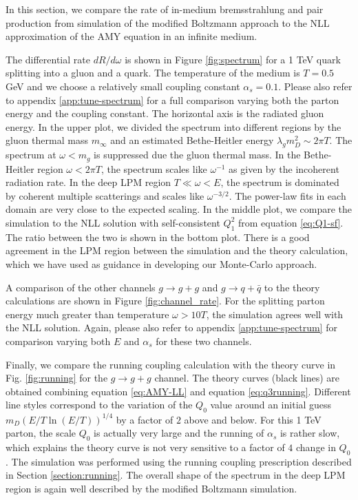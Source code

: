 \documentclass[aps, prc, reprint, amsmath, groupedaddress, nofootinbib]{revtex4-1}
\begin{document}
In this section, we compare the rate of in-medium bremsstrahlung and pair production from simulation of the modified Boltzmann approach to the NLL approximation of the AMY equation in an infinite medium.

The differential rate $dR/d\omega$ is shown in Figure \ref{fig:spectrum} for a 1 TeV quark splitting into a gluon and a quark.
The temperature of the medium is $T=0.5$ GeV and we choose a relatively small coupling constant $\alpha_s = 0.1$.
Please also refer to appendix \ref{app:tune-spectrum} for a full comparison varying both the parton energy and the coupling constant.
The horizontal axis is the radiated gluon energy.
In the upper plot, we divided the spectrum into different regions by the gluon thermal mass $m_\infty$ and an estimated Bethe-Heitler energy $\lambda_g m_D^2 \sim 2\pi T$.
The spectrum at $\omega < m_g$ is suppressed due the gluon thermal mass.
In the Bethe-Heitler region $\omega < 2\pi T$, the spectrum scales like $\omega^{-1}$ as given by the incoherent radiation rate.
In the deep LPM region $T \ll \omega < E$, the spectrum is dominated by coherent multiple scatterings and scales like $\omega^{-3/2}$.
The power-law fits in each domain are very close to the expected scaling.
In the middle plot, we compare the simulation to the NLL solution with self-consistent $Q_1^2$ from equation \ref{eq:Q1-sf}. 
The ratio between the two is shown in the bottom plot.
There is a good agreement in the LPM region between the simulation and the theory calculation, which we have used as guidance in developing our Monte-Carlo approach.

A comparison of the other channels $g\rightarrow g+g$ and $g\rightarrow q+\bar{q}$ to the theory calculations are shown in Figure \ref{fig:channel_rate}.
For the splitting parton energy much greater than temperature $\omega > 10 T$, the simulation agrees well with the NLL solution. 
Again, please also refer to appendix \ref{app:tune-spectrum} for comparison varying both $E$ and $\alpha_s$ for these two channels.


Finally, we compare the running coupling calculation with the theory curve in Fig. \ref{fig:running} for the $g\rightarrow g+g$ channel.
The theory curves (black lines) are obtained combining equation \ref{eq:AMY-LL} and equation \ref{eq:q3running}.
Different line styles correspond to the variation of the $Q_0$ value around an initial guess $m_D (E/T \ln(E/T) )^{1/4}$ by a factor of $2$ above and below.
For this 1 TeV parton, the scale $Q_0$ is actually very large and the running of $\alpha_s$ is rather slow, which explains the theory curve is not very sensitive to a factor of $4$ change in $Q_0$.
The simulation was performed using the running coupling prescription described in Section \ref{section:running}.
The overall shape of the spectrum in the deep LPM region is again well described by the modified Boltzmann simulation. 
\end{document}
